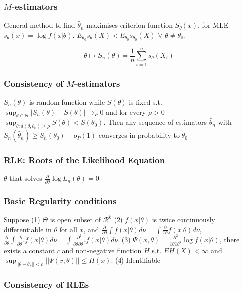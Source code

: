 \subsubsection{$M$-estimators}

General method to find $\hat\theta_n$ maximises criterion function $S_\theta(x)$, for MLE $s_\theta(x) = \log f(x|\theta)$.
$E_{\theta_0}s_\theta(X) < E_{\theta_0}s_{\theta_0}(X)$ $\forall$ $\theta\neq \theta_0$.

$$
\theta \mapsto S_n(\theta) = \frac{1}{n} \sum_{i=1}^n s_\theta(X_i)
$$

\subsubsection{Consistency of $M$-estimators}

$S_n(\theta)$ is random function while $S(\theta)$ is fixed s.t. $\sup_{\theta\in\Theta}|S_n(\theta)-S(\theta)|\rightarrow_P 0$ and for every $\rho > 0$
$\sup_{\theta:d(\theta, \theta_0)\geq\rho}S(\theta)<S(\theta_0)$. Then any sequence of estimators $\hat\theta_n$ with $S_n(\hat\theta_n)\geq S_n(\theta_0)-o_P(1)$ converges in probability to $\theta_0$

\subsubsection{RLE: Roots of the Likelihood Equation}

$\theta$ that solves $\frac{\partial}{\partial\theta}\log L_n(\theta) = 0$

\subsubsection{Basic Regularity conditions}

Suppose (1) $\Theta$ is open subset of $\mathcal{R}^k$ (2) $f(x|\theta)$ is twice continuously differentiable in $\theta$ for all $x$, and
$\frac{\partial}{\partial\theta}\int f(x|\theta) d\nu = \int \frac{\partial}{\partial\theta}f(x|\theta)d\nu$,
$\frac{\partial}{\partial\theta}\int \frac{\partial}{\partial\theta^T} f(x|\theta) d\nu = \int \frac{\partial^2}{\partial\theta\partial\theta^T}f(x|\theta) d\nu$.
(3) $\Psi(x, \theta)=\frac{\partial^2}{\partial\theta\partial\theta^T}\log f(x|\theta)$, there exists a constant $c$ and non-negative function $H$ s.t. $EH(X)<\infty$ and $\sup_{||\theta-\theta_*||<c}||\Psi(x, \theta)||\leq H(x)$.
(4) Identifiable

\subsubsection{Consistency of RLEs}

